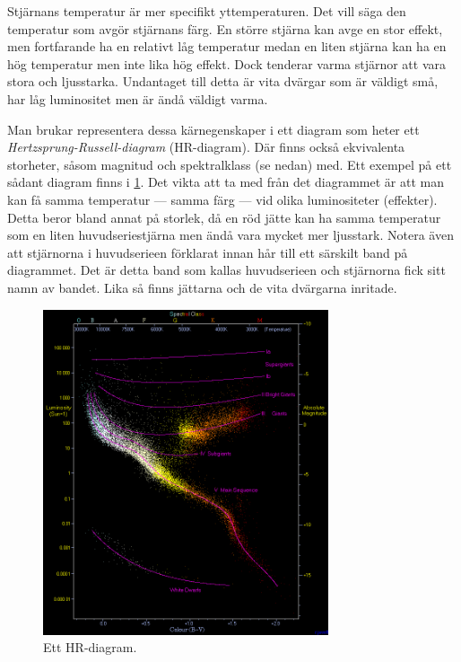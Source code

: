 Stjärnans temperatur är mer specifikt yttemperaturen. Det vill säga den temperatur som avgör stjärnans färg. En större stjärna kan avge en stor effekt, men fortfarande ha en relativt låg temperatur medan en liten stjärna kan ha en hög temperatur men inte lika hög effekt. Dock tenderar varma stjärnor att vara stora och ljusstarka. Undantaget till detta är vita dvärgar som är väldigt små, har låg luminositet men är ändå väldigt varma.

Man brukar representera dessa kärnegenskaper i ett diagram som heter ett \emph{Hertzsprung-Russell-diagram} (HR-diagram). Där finns också ekvivalenta storheter, såsom magnitud och spektralklass (se nedan) med. Ett exempel på ett sådant diagram finns i \cref{fig:hr-diagram}. Det vikta att ta med från det diagrammet är att man kan få samma temperatur --- samma färg --- vid olika luminositeter (effekter). Detta beror bland annat på storlek, då en röd jätte kan ha samma temperatur som en liten huvudseriestjärna men ändå vara mycket mer ljusstark. Notera även att stjärnorna i huvudserieen förklarat innan hår till ett särskilt band på diagrammet. Det är detta band som kallas huvudserieen och stjärnorna fick sitt namn av bandet. Lika så finns jättarna och de vita dvärgarna inritade.

\begin{figure}[h!]
    \centering
    \includegraphics[width=0.75\textwidth]{img/HRDiagram.png}
    \caption{Ett HR-diagram.}
    \label{fig:hr-diagram}
\end{figure}


